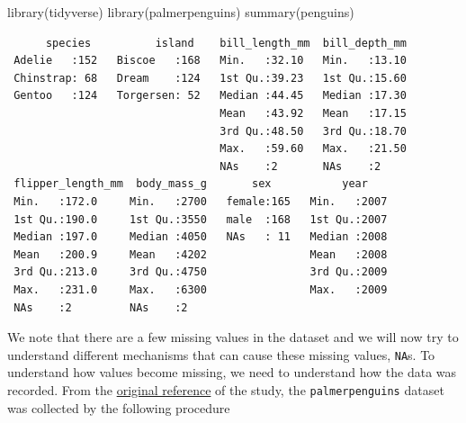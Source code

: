 \documentclass[
  letterpaper,
  DIV=11,
  numbers=noendperiod]{scrreprt}
\newenvironment{Shaded}{\begin{snugshade}}{\end{snugshade}}
\newcommand{\FunctionTok}[1]{\textcolor[rgb]{0.28,0.35,0.67}{#1}}
\newcommand{\NormalTok}[1]{\textcolor[rgb]{0.00,0.23,0.31}{#1}}
\begin{document}
\begin{Shaded}
\begin{Highlighting}[]
\FunctionTok{library}\NormalTok{(tidyverse)}
\FunctionTok{library}\NormalTok{(palmerpenguins)}
\FunctionTok{summary}\NormalTok{(penguins)}
\end{Highlighting}
\end{Shaded}

\begin{verbatim}
      species          island    bill_length_mm  bill_depth_mm  
 Adelie   :152   Biscoe   :168   Min.   :32.10   Min.   :13.10  
 Chinstrap: 68   Dream    :124   1st Qu.:39.23   1st Qu.:15.60  
 Gentoo   :124   Torgersen: 52   Median :44.45   Median :17.30  
                                 Mean   :43.92   Mean   :17.15  
                                 3rd Qu.:48.50   3rd Qu.:18.70  
                                 Max.   :59.60   Max.   :21.50  
                                 NAs    :2       NAs    :2      
 flipper_length_mm  body_mass_g       sex           year     
 Min.   :172.0     Min.   :2700   female:165   Min.   :2007  
 1st Qu.:190.0     1st Qu.:3550   male  :168   1st Qu.:2007  
 Median :197.0     Median :4050   NAs   : 11   Median :2008  
 Mean   :200.9     Mean   :4202                Mean   :2008  
 3rd Qu.:213.0     3rd Qu.:4750                3rd Qu.:2009  
 Max.   :231.0     Max.   :6300                Max.   :2009  
 NAs    :2         NAs    :2                                 
\end{verbatim}

We note that there are a few missing values in the dataset and we will
now try to understand different mechanisms that can cause these missing
values, \texttt{NA}s. To understand how values become missing, we need
to understand how the data was recorded. From the
\href{https://journals.plos.org/plosone/article?id=10.1371/journal.pone.0090081}{original
reference} of the study, the \texttt{palmerpenguins} dataset was
collected by the following procedure
\end{document}
